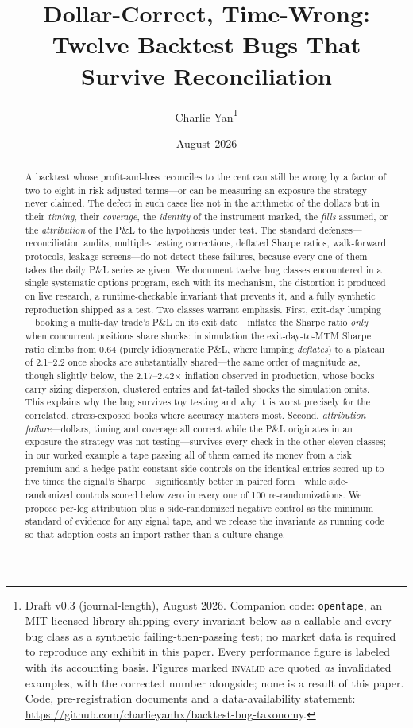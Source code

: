 \documentclass[11pt]{article}
\title{\textbf{Dollar-Correct, Time-Wrong:\\
Twelve Backtest Bugs That Survive Reconciliation}}
\author{Charlie Yan\thanks{Draft v0.3 (journal-length), August 2026. Companion code:
\texttt{opentape}, an MIT-licensed library shipping every invariant below as a callable and
every bug class as a synthetic failing-then-passing test; no market data is required to
reproduce any exhibit in this paper. Every performance figure is labeled with its accounting
basis. Figures marked \textsc{invalid} are quoted \emph{as} invalidated examples, with the
corrected number alongside; none is a result of this paper.
Code, pre-registration documents and a data-availability statement: \url{https://github.com/charlieyanhx/backtest-bug-taxonomy}.}}
\date{August 2026}
\begin{document}
\maketitle

\begin{abstract}
A backtest whose profit-and-loss reconciles to the cent can still be wrong by a factor of two
to eight in risk-adjusted terms---or can be measuring an exposure the strategy never claimed.
The defect in such cases lies not in the arithmetic of the dollars but in their \emph{timing},
their \emph{coverage}, the \emph{identity} of the instrument marked, the \emph{fills} assumed,
or the \emph{attribution} of the P\&L to the hypothesis under test. The standard defenses---reconciliation audits, multiple-
testing corrections, deflated Sharpe ratios, walk-forward protocols, leakage screens---do not
detect these failures, because every one of them takes the daily P\&L series as given. We
document twelve bug classes encountered in a single systematic options program, each with its
mechanism, the distortion it produced on live research, a
runtime-checkable invariant that prevents it, and a fully synthetic reproduction shipped as a
test. Two classes warrant emphasis. First, exit-day lumping---booking a multi-day trade's P\&L
on its exit date---inflates the Sharpe ratio \emph{only} when concurrent positions share
shocks: in simulation the exit-day-to-MTM Sharpe ratio climbs from 0.64 (purely
idiosyncratic P\&L, where lumping \emph{deflates}) to a plateau of 2.1--2.2 once shocks are
substantially shared---the same order of magnitude as, though slightly below, the
2.17--2.42$\times$ inflation observed in production, whose books carry sizing dispersion,
clustered entries and fat-tailed shocks the simulation omits. This explains why the bug survives toy
testing and why it is worst precisely for the correlated, stress-exposed books where accuracy
matters most. Second, \emph{attribution failure}---dollars, timing and coverage all correct
while the P\&L originates in an exposure the strategy was not testing---survives every check in
the other eleven classes; in our worked example a tape passing all of them earned its money
from a risk premium and a hedge path: constant-side controls on the identical entries scored
up to five times the signal's Sharpe---significantly better in paired form---while
side-randomized controls scored below zero in every one of 100 re-randomizations. We propose per-leg attribution plus a
side-randomized negative control as the minimum standard of evidence for any signal tape, and
we release the invariants as running code so that adoption costs an import rather than a
culture change.
\end{abstract}
\end{document}
